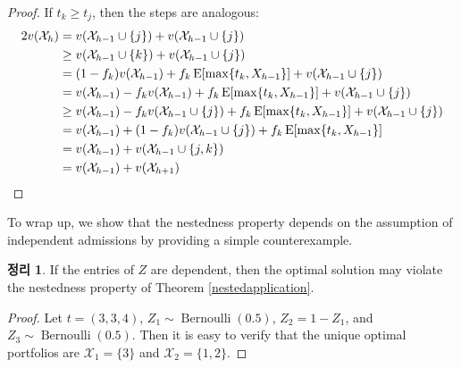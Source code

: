 \documentclass[12pt]{article} %
\newtheorem{theorem}{Theorem}
\theoremstyle{definition}
\newtheorem{theorem}{정리}
\theoremstyle{definition}
\begin{document}
\begin{proof}
If $t_k \geq t_j$, then the steps are analogous:
\begin{align}
2 v(\mathcal{X}_h) &= v(\mathcal{X}_{h-1} \cup\{j\}) + v(\mathcal{X}_{h-1} \cup\{j\}) \\
&\geq v(\mathcal{X}_{h-1} \cup\{k\}) + v(\mathcal{X}_{h-1} \cup\{j\}) \\
&= (1 - f_k) v(\mathcal{X}_{h-1}) + f_k \operatorname{E}[\max\{t_k, X_{h-1}\}] +  v(\mathcal{X}_{h-1} \cup\{j\})  \\
&= v(\mathcal{X}_{h-1}) - f_k  v(\mathcal{X}_{h-1}) + f_k \operatorname{E}[\max\{t_k, X_{h-1}\}] +  v(\mathcal{X}_{h-1} \cup\{j\})  \\
&\geq v(\mathcal{X}_{h-1}) - f_k  v(\mathcal{X}_{h-1}\cup\{j\}) + f_k \operatorname{E}[\max\{t_k, X_{h-1}\}] +  v(\mathcal{X}_{h-1} \cup\{j\})  \\
&= v(\mathcal{X}_{h-1}) + (1 - f_k) v(\mathcal{X}_{h-1}\cup\{j\}) + f_k \operatorname{E}[\max\{t_k, X_{h-1}\}]  \\
&= v(\mathcal{X}_{h-1}) + v(\mathcal{X}_{h-1} \cup\{j, k\})\\
&= v(\mathcal{X}_{h-1})  + v(\mathcal{X}_{h+1})
\qedhere
\end{align}
\end{proof}



To wrap up, we show that the nestedness property depends on the assumption of independent admissions by providing a simple counterexample.


\begin{theorem}
If the entries of $Z$ are dependent, then the optimal solution may violate the nestedness property of Theorem \ref{nestedapplication}.
\end{theorem}

\begin{proof}
Let $t = (3, 3, 4)$, $Z_1 \sim \operatorname{Bernoulli}(0.5)$, $Z_2 = 1 - Z_1$,  and $Z_3 \sim \operatorname{Bernoulli}(0.5)$. Then it is easy to verify that the unique optimal portfolios are $\mathcal{X}_1 = \{3\}$ and $\mathcal{X}_2 = \{1, 2\}$. 
\end{proof}
\end{document}
